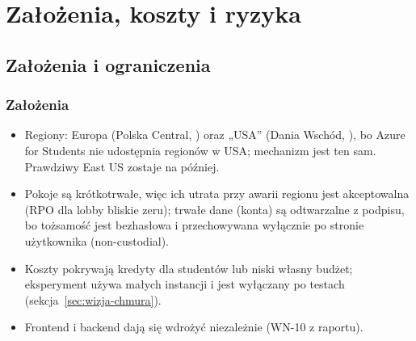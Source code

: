 \chapter{Założenia, koszty i ryzyka}
\label{ch:wizja-zalozenia}

\section{Założenia i ograniczenia}

\subsection{Założenia}
\begin{itemize}
  \item Regiony: Europa (Polska Central, ) oraz „USA'' (Dania
        Wschód, ), bo Azure for Students nie udostępnia regionów w
        USA; mechanizm jest ten sam. Prawdziwy East US zostaje na później.
  \item Pokoje są krótkotrwałe, więc ich utrata przy awarii regionu jest
        akceptowalna (RPO dla lobby bliskie zeru); trwałe dane (konta) są
        odtwarzalne z podpisu, bo tożsamość jest bezhasłowa i przechowywana wyłącznie
        po stronie użytkownika (non-custodial).
  \item Koszty pokrywają kredyty dla studentów lub niski własny budżet; eksperyment
        używa małych instancji i jest wyłączany po testach
        (sekcja~\ref{sec:wizja-chmura}).
  \item Frontend i backend dają się wdrożyć niezależnie (WN-10 z raportu).
\end{itemize}

